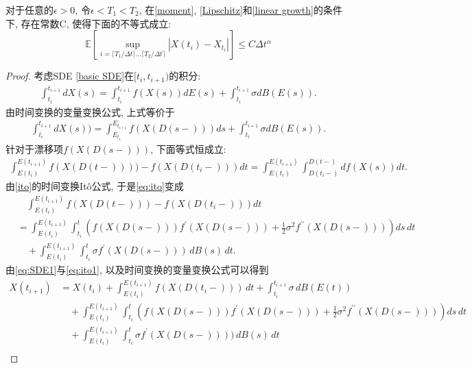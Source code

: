 \begin{theorem}\label{main th EM}
	对于任意的$\epsilon>0$, 令$\epsilon < T_1 < T_2$, 在\textnormal{\cref{moment}}, \textnormal{\cref{Lipschitz}}和\cref{linear growth}的条件下, 存在常数C, 使得下面的不等式成立:
	$$\mathbb{E}\left[\sup\limits_{i=\lceil T_1/\Delta t \rceil\ldots \lceil T_2/\Delta t \rceil } |X({t_i})-X_{t_i}|\right]\le C\Delta t^\alpha$$
\end{theorem}
\begin{proof}
	
	考虑SDE \eqref{basic SDE}在$[t_i, t_{i+1})$的积分:
	\begin{align}
		\int_{t_i}^{t_{i+1}}dX(s)=\int_{t_i}^{t_{i+1}}f(X(s))dE(s)+\int_{t_i}^{t_{i+1}}\sigma dB(E(s)). 
	\end{align}
	由时间变换的变量变换公式\cite{kobayashi2011stochastic}, 上式等价于
	\begin{align}\label{eq:SDE1}
		\int_{t_i}^{t_{i+1}}dX(s))=\int_{E_{t_i}}^{E_{t_{i+1}}}f(X(D(s-)))ds+\int_{t_i}^{t_{i+1}}\sigma dB(E(s)). 
	\end{align}
	针对于漂移项$f(X(D(s-)))$, 下面等式恒成立:
	\begin{align}\label{eq:ito}
		\int_{E(t_i)}^{E(t_{i+1})} f(X(D(t-)))) - f(X(D(t_i-))) dt = \int_{E(t_i)}^{E(t_{i+1})} \int^{D(t-)}_{D(t_i-)} df(X(s)) dt. 
	\end{align}
	由\cref{ito}的时间变换It\^{o}公式, 于是\eqref{eq:ito}变成
	\begin{equation}\label{eq:ito1}
		\begin{aligned}
			&\quad\int_{E(t_i)}^{E(t_{i+1})} f(X(D(t-))) - f(X(D(t_i-))) dt \\
			&= \int_{E(t_i)}^{E(t_{i+1})} \int_{t_i}^{t} \left( f(X(D(s-))) f^{\prime}(X(D(s-))) + \frac{1}{2} \sigma^2 f^{\prime\prime}(X(D(s-))) \right) ds \, dt\\
			&\quad + \int_{E(t_i)}^{E(t_{i+1})} \int_{t_i}^{t} \sigma f^{\prime}(X(D(s-))) \, dB(s) \, dt . 
		\end{aligned}
	\end{equation}
	由\eqref{eq:SDE1}与\eqref{eq:ito1}, 以及时间变换的变量变换公式可以得到
	\begin{align*}
		X(t_{i+1}) 
		&= X(t_i) + \int_{E(t_i)}^{E(t_{i+1})} f(X({D(t_i-)})) \, dt + \int_{t_i}^{t_{i+1}} \sigma \, dB(E(t)) \\
		&\quad + \int_{E(t_i)}^{E(t_{i+1})} \int_{t_i}^{t}\left( f(X(D(s-))) f^{\prime}(X(D(s-))) + \frac{1}{2} \sigma^2 f^{\prime\prime}(X(D(s-))) \right) ds \, dt \\
		&\quad + \int_{E(t_i)}^{E(t_{i+1})} \int_{t_i}^{t}\sigma f^{\prime}(X(D(s-)))) \, dB(s) \, dt \\

\end{align*}
\end{proof}
